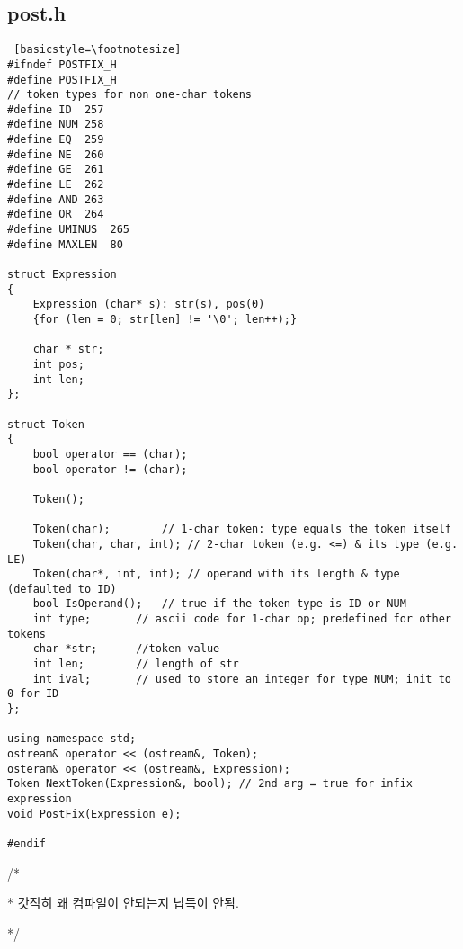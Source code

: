 \documentclass[twoside,twocolumn]{article}
\newenvironment{itemizeReduced}{
\begin{list}{\labelitemi}{\leftmargin=1em}
\setlength{\itemsep}{1pt}
\setlength{\parskip}{0pt}
\setlength{\parsep}{0pt}}{\end{list}
}
\begin{document}
\subsection{post.h}
\begin{lstlisting} [basicstyle=\footnotesize]
#ifndef POSTFIX_H
#define POSTFIX_H
// token types for non one-char tokens
#define ID	257
#define NUM	258
#define EQ	259
#define NE	260
#define GE	261
#define LE	262
#define AND	263
#define OR	264
#define UMINUS	265
#define MAXLEN	80

struct Expression
{
	Expression (char* s): str(s), pos(0)
	{for (len = 0; str[len] != '\0'; len++);}

	char * str;
	int pos;
	int len;
};

struct Token
{
	bool operator == (char);
	bool operator != (char);

	Token();

	Token(char);		// 1-char token: type equals the token itself
	Token(char, char, int);	// 2-char token (e.g. <=) & its type (e.g. LE)
	Token(char*, int, int);	// operand with its length & type (defaulted to ID)
	bool IsOperand();	// true if the token type is ID or NUM
	int type;		// ascii code for 1-char op; predefined for other tokens
	char *str;		//token value
	int len;		// length of str
	int ival;		// used to store an integer for type NUM; init to 0 for ID
};

using namespace std;
ostream& operator << (ostream&, Token);
osteram& operator << (ostream&, Expression);
Token NextToken(Expression&, bool);	// 2nd arg = true for infix expression
void PostFix(Expression e);

#endif
\end{lstlisting}
\begin{itemizeReduced}
    \item[/*] 
    \item[*] 갓직히 왜 컴파일이 안되는지 납득이 안됨.
\end{itemizeReduced}
*/


\newpage




\end{document}
